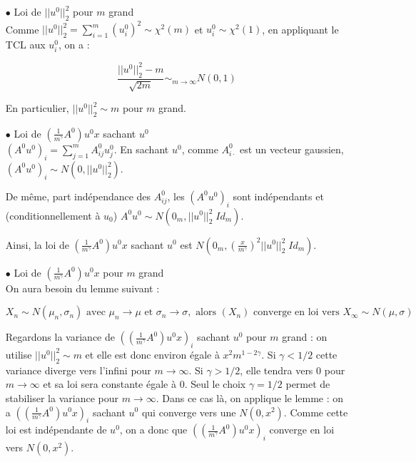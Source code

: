 \documentclass[a4paper, 11pt, french]{article}
\theoremstyle{definition}
\begin{document}
	\begin{itemize}
		
		\item[$\bullet$] Loi de $ || u^0 ||_2^2$ pour $m$ grand \\
		
		Comme $ || u^0 ||_2^2 = \sum_{i=1}^{m} (u_i^0)^2 \sim \chi^2 (m)$ et $ u_i^0 \sim \chi^2 (1)$, en appliquant le TCL aux $ u_i^0 $, on a :
		
		\[
			\frac{|| u^0 ||_2^2 - m}{\sqrt{2m}} \sim_{m \to \infty}  N(0, 1)
		\]
	
		En particulier, $ || u^0 ||_2^2 \sim  m$  pour $m$ grand. \\
		
		\item[$\bullet$] Loi de $ \left(\frac{1}{m^{\gamma}} A^0 \right) u^0 x $ sachant $ u^0 $ \\
		
		$ (A^0 u^0)_i = \sum_{j=1}^m A_{ij}^0 u_j^0$. En sachant $u^0$, comme 
		$A_{i \cdot}^0$ est un vecteur gaussien, $(A^0 u^0)_i \sim  N(0, || u^0 ||_2^2 ) $. 
	
		De même, part indépendance des $A_{ij}^0$, les $(A^0 u^0)_i$ sont indépendants et (conditionnellement à $u_0$) $A^0 u^0 \sim N(0_m, || u^0 ||_2^2 \; Id_m)$.
		
		Ainsi, la loi de $ \left(\frac{1}{m^{\gamma}} A^0 \right) u^0 x $ sachant $ u^0$ est $N(0_m, \left( \frac{x}{m^{\gamma}} \right)^2 || u^0 ||_2^2 \; Id_m) $. \\
	
		\item[$\bullet$] Loi de $ \left(\frac{1}{m^{\gamma}} A^0 \right) u^0 x $ pour $m$ grand \\
		
		On aura besoin du lemme suivant :
		
		\[X_{n} \sim N(\mu_{n},\sigma_{n}) \text{ avec }  \mu_{n}\to\mu \text{ et } \sigma_{n} \to \sigma, \text{ alors } (X_{n}) \text{ converge en loi vers } X_{\infty} \sim N(\mu,\sigma) \]
		
		Regardons la variance de $ \left(\left(\frac{1}{m^{\gamma}} A^0 \right) u^0 x \right)_i$ sachant $ u^0 $ pour $m$ grand : on utilise $ || u^0 ||_2^2 \sim  m$ et elle est donc environ égale à $x^2 m^{1 - 2\gamma}$. Si $\gamma < 1/2$ cette variance diverge vers l'infini pour $m \to \infty$. Si $\gamma > 1/2$, elle tendra vers 0 pour $m \to \infty$ et sa loi sera constante égale à 0. Seul le choix $\gamma = 1/2$ permet de stabiliser la variance pour $m \to \infty$. Dans ce cas là, on applique le lemme : on a $ \left(\left(\frac{1}{m^{\gamma}} A^0 \right) u^0 x \right)_i$ sachant $ u^0 $ qui converge vers une $N(0, x^2)$. Comme cette loi est indépendante de $u^0$, on a donc que $ \left(\left(\frac{1}{m^{\gamma}} A^0 \right) u^0 x \right)_i$ converge en loi vers $N(0,x^2)$. \\
		

\end{itemize}
\end{document}
